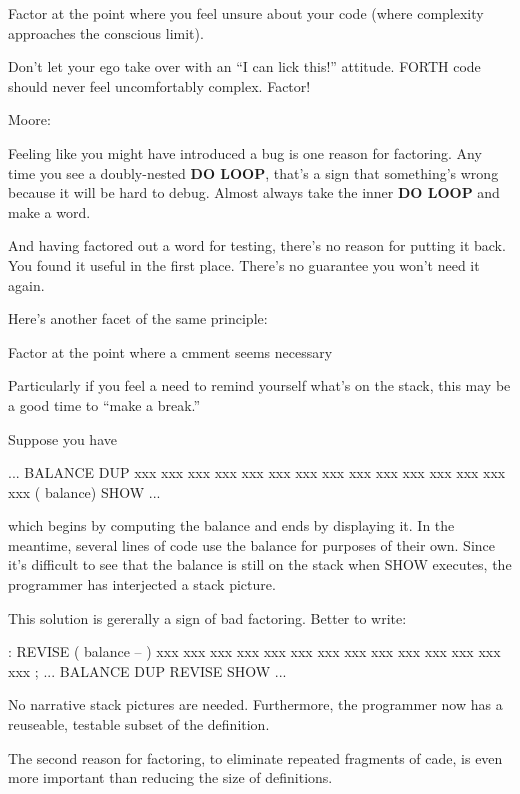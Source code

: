 \begin{tip}
Factor at the point where you feel unsure about your code (where complexity approaches the conscious limit).
\end{tip}
Don't let your ego take over with an ``I can lick this!'' attitude. FORTH code should never feel uncomfortably complex. Factor!

\bigskip
\blackline{2ex}
\noindent Moore:

\begin{tfquot}
Feeling like you might have introduced a bug is one reason for factoring. Any time you see a doubly-nested \textbf{DO LOOP}, that's a sign that something's wrong because it will be hard to debug. Almost always take the inner \textbf{DO LOOP} and make a word.

And having factored out a word for testing, there's no reason for putting it back. You found it useful in the first place. There's no guarantee you won't need it again.
\end{tfquot}
\blackline{1ex}
Here's another facet of the same principle:

\begin{tip}
Factor at the point where a cmment seems necessary
\end{tip}
Particularly if you feel a need to remind yourself what's on the stack, this may be a good time to ``make a break.''

Suppose you have

\begin{Code}
... BALANCE  DUP xxx xxx xxx xxx xxx xxx xxx xxx xxx
     xxx xxx xxx xxx xxx xxx   ( balance) SHOW  ...
\end{Code}
which begins by computing the balance and ends by displaying it. In the meantime, several lines of code use the balance for purposes of their own. Since it's difficult to see that the balance is still on the stack when SHOW executes, the programmer has interjected a stack picture.

This solution is gererally a sign of bad factoring. Better to write:
\begin{Code}
: REVISE  ( balance -- )  xxx xxx xxx xxx xxx xxx xxx
     xxx xxx xxx xxx xxx xxx xxx ;
... BALANCE  DUP REVISE  SHOW  ...
\end{Code}
No narrative stack pictures are needed. Furthermore, the programmer now has a reuseable, testable subset of the definition.

\begin{tip}
The second reason for factoring, to eliminate repeated fragments of cade, is even more important than reducing the size of definitions.
\end{tip}

